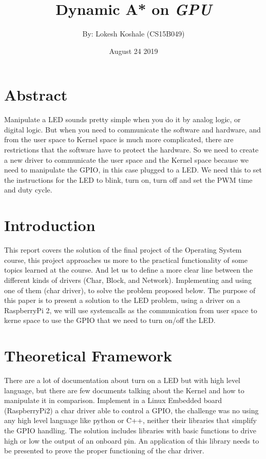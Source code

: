 \documentclass[a4paper]{article}
\title{Dynamic A* on \emph{GPU}}
\author{\normalsize By: Lokesh Koshale (CS15B049) \\\normalsize}
\date{\color{black}August 24 2019}
\begin{document}
 \maketitle

\section{Abstract}
Manipulate a LED sounds pretty simple when you do it by analog logic, or digital logic. But when you need to communicate the software and hardware, and from the user space to Kernel space is much more complicated, there are restrictions that the software have to protect the hardware. So we need to create a new driver to communicate the user space and the Kernel space because we need to manipulate the GPIO, in this case plugged to a LED. We need this to set the instructions for the LED to blink, turn on, turn off and set the PWM time and duty cycle.

\section{Introduction}
This report covers the solution of the final project of the Operating System course, this project approaches us more to the practical functionality of some topics learned at the course. And let us to define a more clear line between the different kinds of drivers (Char, Block, and Network). Implementing and using one of them (char driver), to solve the problem proposed below.
The purpose of this paper is to present a solution to the LED problem, using a driver on a RaspberryPi 2, we will use systemcalls as the communication from user space to kerne space to use the GPIO that we need to turn on/off the LED.

\section{Theoretical Framework}

There are a lot of documentation about turn on a LED but with high level language, but there are few documents talking about the Kernel and how to manipulate it in comparison.
Implement in a Linux Embedded board (RaspberryPi2) a char driver able to control a GPIO, the challenge was no using any high level language like python or C++, neither their libraries that simplify the GPIO handling. The solution includes libraries with basic functions to drive high or low the output of an onboard pin. An application of this library needs to be presented to prove the proper functioning of the char driver. 
\end{document}
